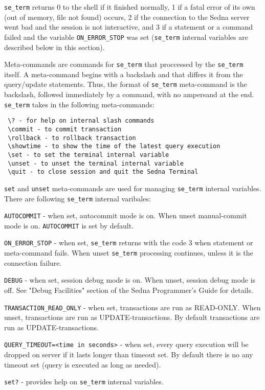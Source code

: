 \documentclass[a4paper,12pt]{article}
\begin{document}
\verb!se_term! returns 0 to the shell if it finished normally, 1 if a fatal error of its own (out of memory, file not
found) occurs, 2 if the connection to the Sedna server went bad and the session is not interactive, and 3 if
a statement or a command failed and the variable \verb!ON_ERROR_STOP! was set (\verb!se_term! internal variables are described below in this section).

Meta-commands are commands for \verb!se_term! that proccessed by the \verb!se_term! itself. A meta-command begins with a backslash and that differs it from the query/update statements. Thus, the format of \verb!se_term! meta-command is the backslash, followed immediately by a command, with no ampersand at the end. \verb!se_term! takes in the following meta-commands:

\begin{verbatim}
 \? - for help on internal slash commands
 \commit - to commit transaction
 \rollback - to rollback transaction
 \showtime - to show the time of the latest query execution
 \set - to set the terminal internal variable
 \unset - to unset the terminal internal variable
 \quit - to close session and quit the Sedna Terminal
\end{verbatim}

\verb!set! and \verb!unset! meta-commands are used for managing \verb!se_term! internal variables. There are following \verb!se_term! internal varibales:

\verb!AUTOCOMMIT! - when set, autocommit mode is on. When unset manual-commit mode is on. \verb!AUTOCOMMIT! is set by default.

\verb!ON_ERROR_STOP! - when set, \verb!se_term! returns with the code 3 when statement or meta-command fails. When unset \verb!se_term! processing continues, unless it is the connection failure.

\verb!DEBUG! - when set, session debug mode is on. When unset, session debug mode is off. See "Debug Facilities" section of the Sedna Programmer's Guide for details.

\verb!TRANSACTION_READ_ONLY! - when set, transactions are run as READ-ONLY. When unset, transactions are run as UPDATE-transactions. By default transactions are run as UPDATE-transactions.

\verb!QUERY_TIMEOUT=<time in seconds>! - when set, every query execution will be dropped on server if it lasts longer than timeout set. By default there is no any timeout set (query is executed as long as needed).

\verb!set?! - provides help on \verb!se_term! internal variables.
\end{document}

